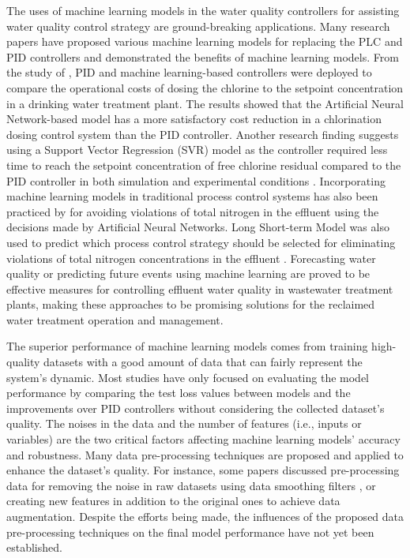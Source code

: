 The uses of machine learning models in the water quality controllers for assisting water quality control strategy are ground-breaking applications. Many research papers have proposed various machine learning models for replacing the PLC and PID controllers and demonstrated the benefits of machine learning models. From the study of \citep{librantzArtificialNeuralNetworks2018}, PID and machine learning-based controllers were deployed to compare the operational costs of dosing the chlorine to the setpoint concentration in a drinking water treatment plant. The results showed that the Artificial Neural Network-based model has a more satisfactory cost reduction in a chlorination dosing control system than the PID controller. Another research finding suggests using a Support Vector Regression (SVR) model as the controller required less time to reach the setpoint concentration of free chlorine residual compared to the PID controller in both simulation and experimental conditions \citet{wangModelPredictiveControl2020}. Incorporating machine learning models in traditional process control systems has also been practiced by \citet{santinFuzzyControlModel2015} for avoiding violations of total nitrogen in the effluent using the decisions made by Artificial Neural Networks. Long Short-term Model was also used to predict which process control strategy should be selected for eliminating violations of total nitrogen concentrations in the effluent \cite{pisaLSTMBasedWastewaterTreatment2019}. Forecasting water quality or predicting future events using machine learning are proved to be effective measures for controlling effluent water quality in wastewater treatment plants, making these approaches to be promising solutions for the reclaimed water treatment operation and management.

The superior performance of machine learning models comes from training high-quality datasets with a good amount of data that can fairly represent the system's dynamic. Most studies have only focused on evaluating the model performance by comparing the test loss values between models and the improvements over PID controllers without considering the collected dataset's quality. The noises in the data and the number of features (i.e., inputs or variables) are the two critical factors affecting machine learning models' accuracy and robustness. Many data pre-processing techniques are proposed and applied to enhance the dataset's quality. For instance, some papers discussed pre-processing data for removing the noise in raw datasets using data smoothing filters \citep{chengForecastingWastewaterTreatment2020}, or creating new features in addition to the original ones \citep{mamandipoorMonitoringDetectingFaults2020} to achieve data augmentation. Despite the efforts being made, the influences of the proposed data pre-processing techniques on the final model performance have not yet been established.


